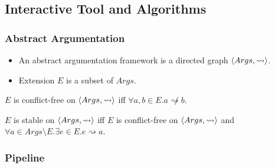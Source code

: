 \documentclass[11pt]{beamer}
\begin{document}
	\subsection{Interactive Tool and Algorithms}

	\begin{frame}
		\frametitle{Abstract Argumentation}
		\begin{itemize}
			\item An abstract argumentation framework is a directed graph $\langle{Args},{\rightsquigarrow}\rangle$.
			\item Extension $E$ is a subset of $Args$.
		\end{itemize}
		
		\begin{definition}
			$E$ is conflict-free on $\langle{Args},{\rightsquigarrow}\rangle$ iff $\forall a,b\in E. a\not\rightsquigarrow b$.
		\end{definition}
	
		\begin{definition}
			$E$ is stable on $\langle{Args},{\rightsquigarrow}\rangle$ iff $E$ is conflict-free on $\langle{Args},{\rightsquigarrow}\rangle$ and $\forall a\in Args\setminus E.\exists e\in E.e\rightsquigarrow a$.
		\end{definition}
	\end{frame}

	\begin{frame}[label=pipeline]
		\frametitle{Pipeline}
		\resizebox{\textwidth}{!}{}
	\end{frame}
\end{document}
